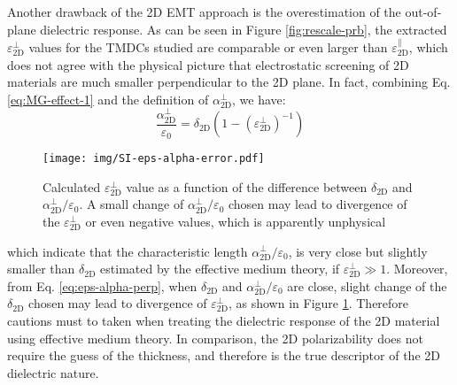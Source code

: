 \documentclass[manuscript=suppinfo,email=true,hyperref=true,keywords=false]{achemso}
\begin{document}
Another drawback of the 2D EMT approach is the
overestimation of the out-of-plane dielectric response. As can be seen
in Figure \ref{fig:rescale-prb}, the extracted
$\varepsilon_{\mathrm{2D}}^{\perp}$ values for the TMDCs studied
are comparable or even larger than
$\varepsilon_{\mathrm{2D}}^{\parallel}$, which does not agree with the
physical picture that electrostatic screening of 2D materials are much
smaller perpendicular to the 2D plane. In fact, combining
Eq. \ref{eq:MG-effect-1} and the definition of $\alpha_{\mathrm{2D}}^{\perp}$, we
have:
\begin{equation}
  \label{eq:eps-alpha-perp}
  \frac{\alpha_{\mathrm{2D}}^{\perp}}{\varepsilon_{0}} = \delta_{\mathrm{2D}}(1 - (\varepsilon_{\mathrm{2D}}^{\perp})^{-1})
\end{equation}

\begin{figure}[htbp]
  \centering
  \texttt{[image: img/SI-eps-alpha-error.pdf]}
  \caption{Calculated $\varepsilon_{\mathrm{2D}}^{\perp}$ value as a
    function of the difference between $\delta_{\mathrm{2D}}$ and
    $\alpha_{\mathrm{2D}}^{\perp}/\varepsilon_{0}$. A small change of
    $\alpha_{\mathrm{2D}}^{\perp}/\varepsilon_{0}$ chosen may lead to divergence of
    the $\varepsilon_{\mathrm{2D}}^{\perp}$ or even negative values,
    which is apparently unphysical}
  \label{fig:eps-alpha-error}
\end{figure}

which indicate that the characteristic length
$\alpha_{\mathrm{2D}}^{\perp}/\varepsilon_{0}$, is very close but slightly smaller
than $\delta_{\mathrm{2D}}$ estimated by the effective medium theory,
if $\varepsilon^{\perp}_{\mathrm{2D}} \gg 1$. Moreover, from
Eq. \ref{eq:eps-alpha-perp}, when $\delta_{\mathrm{2D}}$ and
$\alpha_{\mathrm{2D}}^{\perp}/\varepsilon_{0}$ are close, slight change of the
$\delta_{\mathrm{2D}}$ chosen may lead to divergence of
$\varepsilon_{\mathrm{2D}}^{\perp}$, as shown in Figure
\ref{fig:eps-alpha-error}. Therefore cautions must to taken when
treating the dielectric response of the 2D material using effective
medium theory. In comparison, the 2D polarizability does not require
the guess of the thickness, and therefore is the true descriptor of
the 2D dielectric nature.
\end{document}
